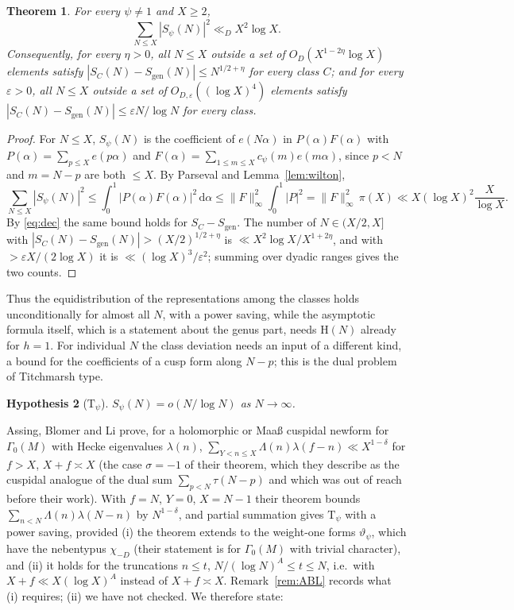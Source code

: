 \documentclass[11pt]{amsart}
\newtheorem{theorem}{Theorem}[section]
\newtheorem{hypothesis}[theorem]{Hypothesis}
\theoremstyle{remark}
\newcommand{\vt}{\vartheta}
\newcommand{\dd}{\,\mathrm d}
\newcommand{\gen}{\mathrm{gen}}
\newcommand{\e}{\varepsilon}
\begin{document}
\begin{theorem}\label{thm:almostall}
For every $\psi\ne1$ and $X\ge2$,
\[
\sum_{N\le X}|S_\psi(N)|^2\ll_DX^2\log X .
\]
Consequently, for every $\eta>0$, all $N\le X$ outside a set of $O_D(X^{1-2\eta}\log X)$ elements satisfy $|S_C(N)-S_\gen(N)|\le N^{1/2+\eta}$ for every class $C$; and for every $\e>0$, all $N\le X$ outside a set of $O_{D,\e}((\log X)^4)$ elements satisfy $|S_C(N)-S_\gen(N)|\le\e N/\log N$ for every class.
\end{theorem}
\begin{proof}
For $N\le X$, $S_\psi(N)$ is the coefficient of $e(N\alpha)$ in $P(\alpha)F(\alpha)$ with $P(\alpha)=\sum_{p\le X}e(p\alpha)$ and $F(\alpha)=\sum_{1\le m\le X}c_\psi(m)e(m\alpha)$, since $p<N$ and $m=N-p$ are both $\le X$. By Parseval and Lemma~\ref{lem:wilton},
\[
\sum_{N\le X}|S_\psi(N)|^2\le\int_0^1|P(\alpha)F(\alpha)|^2\dd\alpha\le\|F\|_\infty^2\int_0^1|P|^2=\|F\|^2_\infty\,\pi(X)\ll X(\log X)^2\frac X{\log X}.
\]
By \eqref{eq:dec} the same bound holds for $S_C-S_\gen$. The number of $N\in(X/2,X]$ with $|S_C(N)-S_\gen(N)|>(X/2)^{1/2+\eta}$ is $\ll X^2\log X/X^{1+2\eta}$, and with $>\e X/(2\log X)$ it is $\ll(\log X)^3/\e^2$; summing over dyadic ranges gives the two counts.
\end{proof}

Thus the equidistribution of the representations among the classes holds unconditionally for almost all $N$, with a power saving, while the asymptotic formula itself, which is a statement about the genus part, needs $\mathrm H(N)$ already for $h=1$. For individual $N$ the class deviation needs an input of a different kind, a bound for the coefficients of a cusp form along $N-p$; this is the dual problem of Titchmarsh type.

\begin{hypothesis}[$\mathrm{T}_\psi$]\label{hyp:T}
$S_\psi(N)=o(N/\log N)$ as $N\to\infty$.
\end{hypothesis}

Assing, Blomer and Li \cite[Theorem~1.3]{ABL} prove, for a holomorphic or Maa\ss{} cuspidal newform for $\Gamma_0(M)$ with Hecke eigenvalues $\lambda(n)$, $\sum_{Y<n\le X}\Lambda(n)\lambda(f-n)\ll X^{1-\delta}$ for $f>X$, $X+f\asymp X$ (the case $\sigma=-1$ of their theorem, which they describe as the cuspidal analogue of the dual sum $\sum_{p<N}\tau(N-p)$ and which was out of reach before their work). With $f=N$, $Y=0$, $X=N-1$ their theorem bounds $\sum_{n<N}\Lambda(n)\lambda(N-n)$ by $N^{1-\delta}$, and partial summation gives $\mathrm T_\psi$ with a power saving, provided (i) the theorem extends to the weight-one forms $\vt_\psi$, which have the nebentypus $\chi_{-D}$ (their statement is for $\Gamma_0(M)$ with trivial character), and (ii) it holds for the truncations $n\le t$, $N/(\log N)^{A}\le t\le N$, i.e.\ with $X+f\ll X(\log X)^A$ instead of $X+f\asymp X$. Remark~\ref{rem:ABL} records what (i) requires; (ii) we have not checked. We therefore state:
\end{document}

